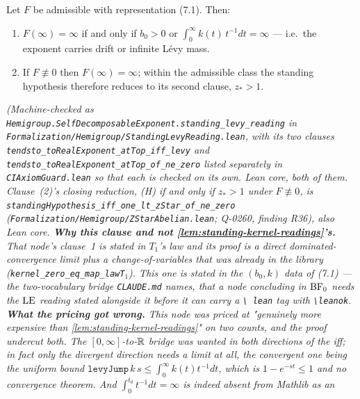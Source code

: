 \begin{lemma}\label{lem:standing-levy-reading}
\leanok
Let $F$ be admissible with representation (7.1). Then:
\begin{enumerate}
\item $F(\infty) = \infty$ if and only if $b_0 > 0$ or $\int_0^\infty k(t)\,t^{-1}dt = \infty$
--- i.e.\ the exponent carries drift or infinite Lévy mass.
\item If $F \not\equiv 0$ then $F(\infty) = \infty$; within the admissible class the standing
hypothesis therefore reduces to its second clause, $z_* > 1$.
\end{enumerate}
\statusT\quad\emph{(Machine-checked as
\texttt{Hemigroup.SelfDecomposableExponent.standing\_levy\_reading} in
\texttt{Formalization/Hemigroup/StandingLevyReading.lean}, with its two clauses
\texttt{tendsto\_toRealExponent\_atTop\_iff\_levy} and
\texttt{tendsto\_toRealExponent\_atTop\_of\_ne\_zero} listed separately in
\texttt{CIAxiomGuard.lean} so that each is checked on its own. Lean core, both of them.
Clause~(2)'s closing reduction, (H) if and only if $z_* > 1$ under $F \not\equiv 0$, is
\texttt{standingHypothesis\_iff\_one\_lt\_zStar\_of\_ne\_zero}
(\texttt{Formalization/Hemigroup/ZStarAbelian.lean}; Q-0260, finding R36), also Lean core.
\textbf{Why this clause and not \ref{lem:standing-kernel-readings}'s.} That node's clause~1 is
stated in $T_1$'s law and its proof is a direct dominated-convergence limit plus a
change-of-variables that was already in the library
(\texttt{kernel\_zero\_eq\_map\_lawT}$_1$). This one is stated in the $(b_0,k)$ data of (7.1) ---
the two-vocabulary bridge \texttt{CLAUDE.md} names, that a node concluding in $\mathrm{BF}_0$
needs the $\mathrm{LE}$ reading stated alongside it before it can carry a \texttt{\textbackslash
lean} tag with \texttt{\textbackslash leanok}.
\textbf{What the pricing got wrong.} This node was priced at "genuinely more expensive than
\ref{lem:standing-kernel-readings}" on two counts, and the proof undercut both. The
$[0,\infty]$-to-$\mathbb{R}$ bridge was wanted in \emph{both} directions of the iff; in fact only the
divergent direction needs a limit at all, the convergent one being the uniform bound
$\texttt{levyJump}\,k\,s \le \int_0^\infty k(t)t^{-1}dt$, which is $1 - e^{-st} \le 1$ and no
convergence theorem. And $\int_0^{t_0}t^{-1}dt = \infty$ is indeed absent from Mathlib as an
}
\end{lemma}
